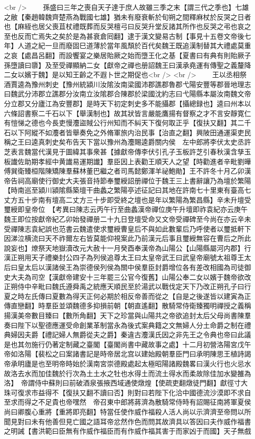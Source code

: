 <br />
　　孫盛曰三年之喪自天子達于庶人故雖三季之末【謂三代之季也】七雄之敝【秦趙韓魏齊楚燕為戰國七雄】猶未有廢衰斬於旬朔之間釋麻杖於反哭之日者也【麻絰也居父喪苴杖禮既葬而反哭檀弓曰反哭升堂反諸其所作也反哭之弔也哀之至也反而亡焉失之矣於是為甚衰倉囘翻】逮于漢文變易古制【事見十五卷文帝後七年】人道之紀一旦而廢固巳道薄於當年風頹於百代矣魏王既追漢制替其大禮處莫重之哀【處昌呂翻】而設饗宴之樂居貽厥之始而墮王化之基【夏書曰有典有則貽厥子孫墮讀曰隳】及至受禪顯納二女【獻帝之禪也册詔魏王曰漢承堯運有傳聖之義釐降二女以嬪于魏】是以知王齡之不遐卜世之期促也<br />
<br />
　　王以丞相祭酒賈逵為豫州刺史【豫州統潁川汝隂汝南梁國沛郡譙郡魯郡弋陽安豐等郡晉地理志曰魏武分沛郡立譙郡分汝南立汝隂郡合陳郡於梁國沈約志曰弋陽縣本屬汝南魏文帝分立郡又分廬江為安豐郡】是時天下初定刺史多不能攝郡【攝總録也】逵曰州本以六條詔書察二千石以下【舉漢制也】故其狀皆言嚴能鷹揚有督察之才不言安靜寛仁有愷悌之德也今長吏慢灋盜賊公行州知而不糾天下復何取正乎【復扶又翻】其二千石以下阿縱不如灋者皆舉奏免之外脩軍旅内治民事【治直之翻】興陂田通運渠吏民稱之王曰逵真刺史矣布告天下當以豫州為灋賜逵爵關内侯　左中郎將李伏太史丞許芝表言魏當代漢見于圖緯其事衆甚【據獻帝傳李伏引孔子玉板許芝引春秋漢含孳玉板䜟佐助期孝經中黄䜟易運期䜟】羣臣因上表勸王順天人之望【時勸進者辛毗劉曄傅巽衛臻桓階陳矯陳羣蘇林董巴繼之者司馬懿鄭渾羊祕鮑勛】王不許冬十月乙卯漢帝告祠高廟使行御史大夫張音持節奉璽綬詔册禪位于魏王三上書辭讓乃為壇於繁陽【時南巡至潁川潁隂縣築壇干曲蠡之繁陽亭述征記曰其地在許南七十里東有臺高七丈方五十步南有壇高二丈方三十步即受終之壇也是年以繁陽為繁昌縣】辛未升壇受璽綬即皇帝位　【考異曰陳志云丙午行至曲蠡漢帝禪位庚午升壇即祚袁紀亦云庚午魏王即位按獻帝紀乙卯始發禪册二十九日登壇受命又文帝受禪碑至今尚在亦云辛未受禪陳志袁紀誤也范書云魏遣使求璽綬曹皇后不與如此數輩后乃呼使者以璽抵軒下因涕泣横流曰天不祚爾左右皆莫能仰視案此乃前漢元后事且璽綬無容在曹后之所此說妄也】燎祭天地嶽瀆改元大赦十一月癸酉奉漢帝為山陽公【山陽縣屬河内郡】行漢正朔用天子禮樂封公四子為列侯追尊太王曰太皇帝武王曰武皇帝廟號太祖尊王太后曰皇太后以漢諸侯王為崇德侯列侯為關中侯羣臣封爵增位各有差改相國為司徒御史大夫為司空【漢獻帝建安十三年罷三公官今復舊】山陽公奉二女以嬪于魏帝欲改正朔侍中辛毗曰魏氏遵舜禹之統應天順民至於湯武以戰伐定天下乃改正朔孔子曰行夏之時左氏傳曰夏數為得天正何必期於相反帝善而從之【自是之後遂皆以建寅為正傳直戀翻】時羣臣並頌魏德多抑損前朝【朝直遙翻】散騎常侍衛臻獨明禪授之義稱揚漢美帝數目臻曰【數所角翻】天下之珍當與山陽共之帝欲追封太后父母尚書陳羣奏曰陛下以聖德應運受命創業革制當永為後式案典籍之文無婦人分土命爵之制在禮典婦因夫爵【禮記婦人無爵從夫之爵】秦違古灋漢氏因之非先王之令典也帝曰此議是也其勿施行仍著定制藏之臺閣【臺閣尚書中藏故事之處】十二月初營洛陽宮戊午帝如洛陽【裴松之曰案諸書記是時帝居北宫以建始殿朝羣臣門曰承明陳思王植詩謁帝承明廬是也至明帝時始於漢南宮崇德殿處起太極昭陽諸殿魏畧曰漢火行也火忌水故洛去水而加佳魏於行次為土土水之牡也水得土而流土得水而柔故除佳加水變雒為洛】　帝謂侍中蘇則曰前破酒泉張掖西域通使燉煌【使疏吏翻燉徒門翻】獻徑寸大珠可復求市益得不【復扶又翻不讀曰否】則對曰若陛下化洽中國德流沙漠即不求自至求而得之不足貴也帝嘿然　帝召東中郎將蔣濟為散騎常侍時有詔賜征南將軍夏侯尚曰卿腹心重將【重將即亮翻】特當任使作威作福殺人活人尚以示濟濟至帝問以所聞見對曰未有他善但見亡國之語耳帝忿然作色而問其故濟具以答因曰夫作威作福書之明誡【書洪範曰臣無有作威作福臣而有作威作福其害于而家凶于而國】天子無戲